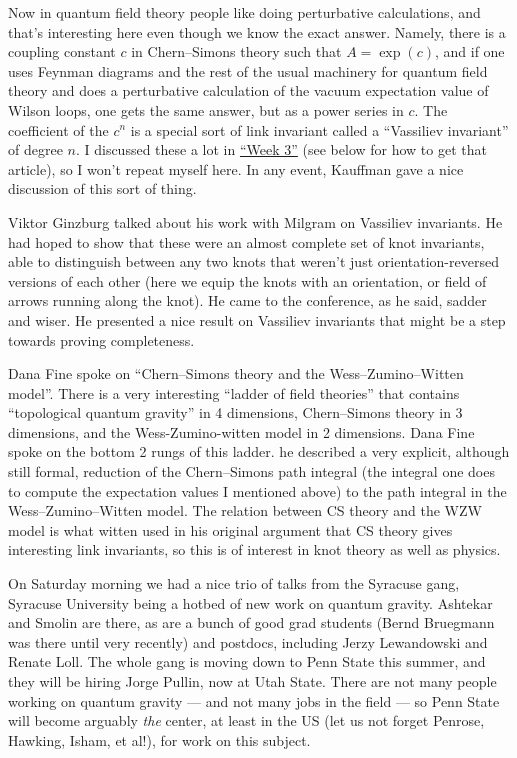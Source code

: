 \documentclass{article}
\begin{document}
Now in quantum field theory people like doing perturbative calculations,
and that's interesting here even though we know the exact answer.
Namely, there is a coupling constant \(c\) in Chern--Simons theory such
that \(A = \exp(c)\), and if one uses Feynman diagrams and the rest of
the usual machinery for quantum field theory and does a perturbative
calculation of the vacuum expectation value of Wilson loops, one gets
the same answer, but as a power series in \(c\). The coefficient of the
\(c^n\) is a special sort of link invariant called a ``Vassiliev
invariant'' of degree \(n\). I discussed these a lot in
\protect\hyperlink{week3}{``Week 3''} (see below for how to get that
article), so I won't repeat myself here. In any event, Kauffman gave a
nice discussion of this sort of thing.

Viktor Ginzburg talked about his work with Milgram on Vassiliev
invariants. He had hoped to show that these were an almost complete set
of knot invariants, able to distinguish between any two knots that
weren't just orientation-reversed versions of each other (here we equip
the knots with an orientation, or field of arrows running along the
knot). He came to the conference, as he said, sadder and wiser. He
presented a nice result on Vassiliev invariants that might be a step
towards proving completeness.

Dana Fine spoke on ``Chern--Simons theory and the Wess--Zumino--Witten
model''. There is a very interesting ``ladder of field theories'' that
contains ``topological quantum gravity'' in 4 dimensions, Chern--Simons
theory in 3 dimensions, and the Wess-Zumino-witten model in 2
dimensions. Dana Fine spoke on the bottom 2 rungs of this ladder. he
described a very explicit, although still formal, reduction of the
Chern--Simons path integral (the integral one does to compute the
expectation values I mentioned above) to the path integral in the
Wess--Zumino--Witten model. The relation between CS theory and the WZW
model is what witten used in his original argument that CS theory gives
interesting link invariants, so this is of interest in knot theory as
well as physics.

On Saturday morning we had a nice trio of talks from the Syracuse gang,
Syracuse University being a hotbed of new work on quantum gravity.
Ashtekar and Smolin are there, as are a bunch of good grad students
(Bernd Bruegmann was there until very recently) and postdocs, including
Jerzy Lewandowski and Renate Loll. The whole gang is moving down to Penn
State this summer, and they will be hiring Jorge Pullin, now at Utah
State. There are not many people working on quantum gravity --- and not
many jobs in the field --- so Penn State will become arguably \emph{the}
center, at least in the US (let us not forget Penrose, Hawking, Isham,
et al!), for work on this subject.
\end{document}
